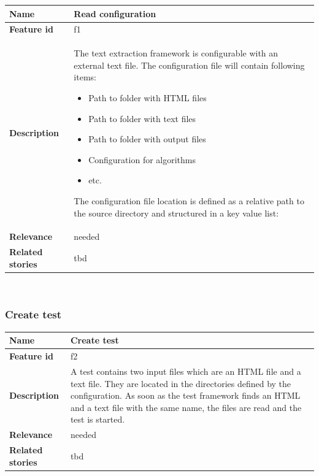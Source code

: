 	\begin{tabular}{ | p{3cm} | p{12cm} |}
	\hline
	\textbf{Name} 				& Read configuration 				\\ \hline
	\textbf{Feature id} 		& f1 				\\ \hline
	\textbf{Description} 		& The text extraction framework is configurable with an external text file. The configuration file will contain following items:
							        \begin{itemize}
							        \item Path to folder with HTML files
							        \item Path to folder with text files
							        \item Path to folder with output files
							        \item Configuration for algorithms
							        \item etc.
						        \end{itemize} 
						        The configuration file location is defined as a relative path to the source directory and structured in a key value list: 

						         \\ \hline
	\textbf{Relevance} 			& needed 			\\ \hline
	\textbf{Related stories} 	& tbd		\\ \hline
	\end{tabular} \\

\subsubsection{Create test}
\label{subsec:Create test}

	\begin{tabular}{ | p{3cm} | p{12cm} |}
	\hline
	\textbf{Name} 				& Create test \\ \hline
	\textbf{Feature id} 		& f2 \\ \hline
	\textbf{Description} 		& A test contains two input files which are an HTML file and a text file. They are located in the directories defined by the configuration. As soon as the test framework finds an HTML and a text file with the same name, the files are read and the test is started.\\ \hline
	\textbf{Relevance} 			& needed \\ \hline
	\textbf{Related stories} 	& tbd \\ \hline
	\end{tabular} \\

